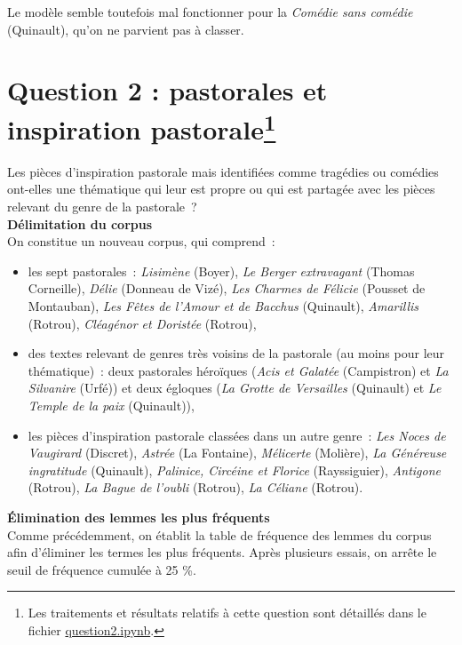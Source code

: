 \documentclass[a4paper,twoside,12pt]{article}
\begin{document}
Le modèle semble toutefois mal fonctionner pour la \textit{Comédie sans comédie} (Quinault), qu'on ne parvient pas à classer.


\section*{Question 2 : pastorales et inspiration pastorale\footnote{Les traitements et résultats relatifs à cette question sont détaillés dans le fichier \href{https://github.com/ragbx/enc-eval-philo-comp/blob/master/question2.ipynb}{question2.ipynb}.}}
Les pièces d'inspiration pastorale mais identifiées comme tragédies ou comédies ont-elles une thématique qui leur est propre ou qui est partagée avec les pièces relevant du genre de la pastorale\ ?\\

\textbf{Délimitation du corpus}\\
On constitue un nouveau corpus, qui comprend\ :
\begin{itemize}
\item les sept pastorales\ : \textit{Lisimène} (Boyer), \textit{Le Berger extravagant} (Thomas Corneille), \textit{Délie} (Donneau de Vizé), \textit{Les Charmes de Félicie} (Pousset de Montauban), \textit{Les Fêtes de l'Amour et de Bacchus} (Quinault), \textit{Amarillis} (Rotrou), \textit{Cléagénor et Doristée} (Rotrou),
\item des textes relevant de genres très voisins de la pastorale (au moins pour leur thématique)\ : deux pastorales héroïques (\textit{Acis et Galatée} (Campistron) et \textit{La Silvanire} (Urfé)) et deux égloques (\textit{La Grotte de Versailles} (Quinault) et \textit{Le Temple de la paix} (Quinault)),
\item les pièces d'inspiration pastorale classées dans un autre genre\ : \textit{Les Noces de Vaugirard} (Discret), \textit{Astrée} (La Fontaine), \textit{Mélicerte} (Molière), \textit{La Généreuse ingratitude} (Quinault), \textit{Palinice, Circéine et Florice} (Rayssiguier), \textit{Antigone} (Rotrou), \textit{La Bague de l'oubli} (Rotrou), \textit{La Céliane} (Rotrou).\\
\end{itemize}

\textbf{Élimination des lemmes les plus fréquents}\\
Comme précédemment, on établit la table de fréquence des lemmes du corpus afin d'éliminer les termes les plus fréquents. Après plusieurs essais, on arrête le seuil de fréquence cumulée à 25 \%.\\
\end{document}
